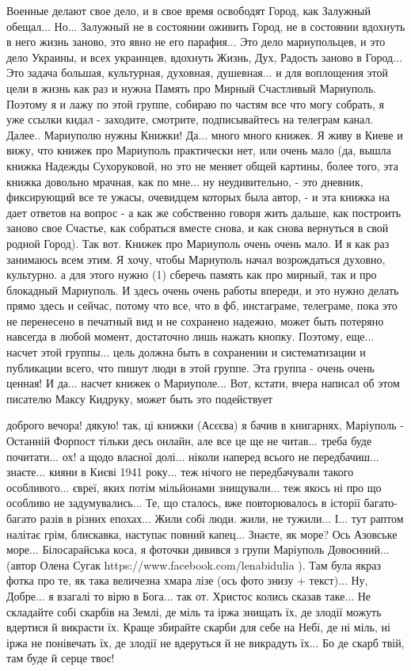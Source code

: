 Военные делают свое дело, и в свое время освободят Город, как Залужный
обещал... Но... Залужный не в состоянии оживить Город, не в состоянии вдохнуть
в него жизнь заново, это явно не его парафия... Это дело мариупольцев, и это
дело Украины, и всех украинцев, вдохнуть Жизнь, Дух, Радость заново в Город...
Это задача большая, культурная, духовная, душевная... и для воплощения этой
цели в жизнь как раз и нужна Память про Мирный Счастливый Мариуполь. Поэтому я
и лажу по этой группе, собираю по частям все что могу собрать, я уже ссылки
кидал - заходите, смотрите, подписывайтесь на телеграм канал. Далее.. Мариуполю
нужны Книжки! Да... много много книжек. Я живу в Киеве и вижу, что книжек про
Мариуполь практически нет, или очень мало (да, вышла книжка Надежды
Сухоруковой, но это не меняет общей картины, более того, эта книжка довольно
мрачная, как по мне... ну неудивительно, - это дневник, фиксирующий все те
ужасы, очевидцем которых была автор, - и эта книжка на дает ответов на вопрос -
а как же собственно говоря жить дальше, как построить заново свое Счастье, как
собраться вместе снова, и как снова вернуться в свой родной Город). Так вот.
Книжек про Мариуполь очень очень мало. И я как раз занимаюсь всем этим. Я хочу,
чтобы Мариуполь начал возрождаться духовно, культурно. а для этого нужно (1)
сберечь память как про мирный, так и про блокадный Мариуполь. И здесь очень
очень работы впереди, и это нужно делать прямо здесь и сейчас, потому что все,
что в фб, инстаграме, телеграме, пока это не перенесено в печатный вид и не
сохранено надежно, может быть потеряно навсегда в любой момент, достаточно лишь
нажать кнопку. Поэтому, еще... насчет этой группы... цель должна быть в
сохранении и систематизации и публикации всего, что пишут люди в этой группе.
Эта группа - очень очень ценная! И да... насчет книжек о Мариуполе... Вот,
кстати, вчера написал об этом писателю Максу Кидруку, может быть это
подействует

доброго вечора! дякую! так, ці книжки (Асєєва) я бачив в книгарнях, Маріуполь -
Останній Форпост тільки десь онлайн, але все це ще не читав... треба буде
почитати... ох! а щодо власної долі... ніколи наперед всього не передбачиш...
знаєте... кияни в Києві 1941 року... теж нічого не передбачували такого
особливого... євреї, яких потім мільйонами знищували... теж якось ні про що
особливо не задумувались... Те, що сталось, вже повторювалось в історії
багато-багато разів в різних епохах... Жили собі люди. жили, не тужили... І...
тут раптом налітає грім, блискавка, наступає повний капец... Знаєте, як море?
Ось Азовське море... Білосарайська коса, я фоточки дивився з групи Маріуполь
Довоєнний... (автор Олена Сугак https://www.facebook.com/lenabidulia ). Там
була якраз фотка про те, як така величезна хмара лізе (ось фото знизу +
текст)... Ну, Добре... я взагалі то вірю в Бога... так от. Христос колись
сказав таке... Не складайте собі скарбів на Землі, де міль та іржа знищать їх,
де злодії можуть вдертися й викрасти їх. Краще збирайте скарби для себе на
Небі, де ні міль, ні іржа не понівечать їх, де злодії не вдеруться й не
викрадуть їх... Бо де скарб твій, там буде й серце твоє!


